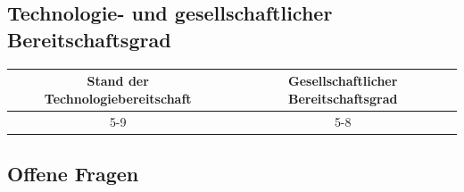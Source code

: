 \documentclass[
]{book}
\begin{document}
\hypertarget{technologie--und-gesellschaftlicher-bereitschaftsgrad-4}{%
\subsection*{Technologie- und gesellschaftlicher Bereitschaftsgrad}\label{technologie--und-gesellschaftlicher-bereitschaftsgrad-4}}

\begin{longtable}[]{@{}cc@{}}
\toprule
Stand der Technologiebereitschaft & Gesellschaftlicher Bereitschaftsgrad\tabularnewline
\midrule
\endhead
5-9 & 5-8\tabularnewline
\bottomrule
\end{longtable}

\hypertarget{offene-fragen-6}{%
\subsection*{Offene Fragen}\label{offene-fragen-6}}
\end{document}
